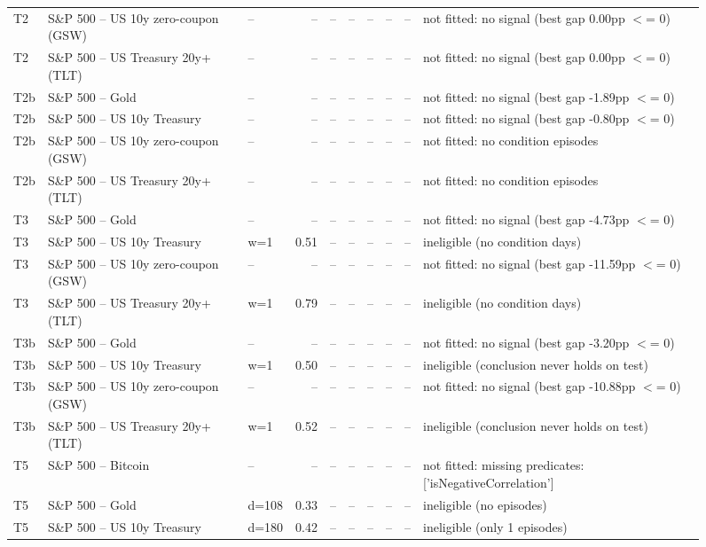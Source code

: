 \begin{figure}
\begin{tabular}{lllrrrrrrl}
T2 & S\&P 500 -- US 10y zero-coupon (GSW) & -- & -- & -- & -- & -- & -- & -- & not fitted: no signal (best gap 0.00pp $<$= 0) \\
T2 & S\&P 500 -- US Treasury 20y+ (TLT) & -- & -- & -- & -- & -- & -- & -- & not fitted: no signal (best gap 0.00pp $<$= 0) \\
T2b & S\&P 500 -- Gold & -- & -- & -- & -- & -- & -- & -- & not fitted: no signal (best gap -1.89pp $<$= 0) \\
T2b & S\&P 500 -- US 10y Treasury & -- & -- & -- & -- & -- & -- & -- & not fitted: no signal (best gap -0.80pp $<$= 0) \\
T2b & S\&P 500 -- US 10y zero-coupon (GSW) & -- & -- & -- & -- & -- & -- & -- & not fitted: no condition episodes \\
T2b & S\&P 500 -- US Treasury 20y+ (TLT) & -- & -- & -- & -- & -- & -- & -- & not fitted: no condition episodes \\
T3 & S\&P 500 -- Gold & -- & -- & -- & -- & -- & -- & -- & not fitted: no signal (best gap -4.73pp $<$= 0) \\
T3 & S\&P 500 -- US 10y Treasury & w=1 & 0.51 & -- & -- & -- & -- & -- & ineligible (no condition days) \\
T3 & S\&P 500 -- US 10y zero-coupon (GSW) & -- & -- & -- & -- & -- & -- & -- & not fitted: no signal (best gap -11.59pp $<$= 0) \\
T3 & S\&P 500 -- US Treasury 20y+ (TLT) & w=1 & 0.79 & -- & -- & -- & -- & -- & ineligible (no condition days) \\
T3b & S\&P 500 -- Gold & -- & -- & -- & -- & -- & -- & -- & not fitted: no signal (best gap -3.20pp $<$= 0) \\
T3b & S\&P 500 -- US 10y Treasury & w=1 & 0.50 & -- & -- & -- & -- & -- & ineligible (conclusion never holds on test) \\
T3b & S\&P 500 -- US 10y zero-coupon (GSW) & -- & -- & -- & -- & -- & -- & -- & not fitted: no signal (best gap -10.88pp $<$= 0) \\
T3b & S\&P 500 -- US Treasury 20y+ (TLT) & w=1 & 0.52 & -- & -- & -- & -- & -- & ineligible (conclusion never holds on test) \\
T5 & S\&P 500 -- Bitcoin & -- & -- & -- & -- & -- & -- & -- & not fitted: missing predicates: ['isNegativeCorrelation'] \\
T5 & S\&P 500 -- Gold & d=108 & 0.33 & -- & -- & -- & -- & -- & ineligible (no episodes) \\
T5 & S\&P 500 -- US 10y Treasury & d=180 & 0.42 & -- & -- & -- & -- & -- & ineligible (only 1 episodes) \\

\end{tabular}
\end{figure}
